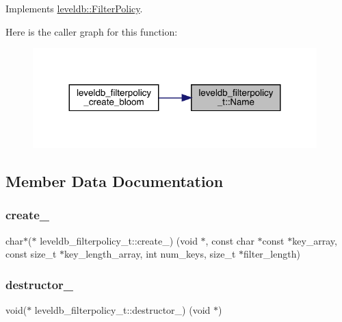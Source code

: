 Implements \mbox{\hyperlink{classleveldb_1_1_filter_policy_afd5e951892a2e740f186c0658913ea1b}{leveldb\+::\+Filter\+Policy}}.

Here is the caller graph for this function\+:
\nopagebreak
\begin{figure}[H]
\begin{center}
\leavevmode
\includegraphics[width=311pt]{structleveldb__filterpolicy__t_a94f31f3d4576ed53d9277e461717e9f3_icgraph}
\end{center}
\end{figure}


\subsection{Member Data Documentation}
\mbox{\label{structleveldb__filterpolicy__t_acf8194876ecb2c47ef33cb7a7dec3d8e}} 
\subsubsection{\texorpdfstring{create\_}{create\_}}
{\footnotesize\ttfamily char$\ast$($\ast$ leveldb\+\_\+filterpolicy\+\_\+t\+::create\+\_\+) (void $\ast$, const char $\ast$const  $\ast$key\+\_\+array, const size\+\_\+t $\ast$key\+\_\+length\+\_\+array, int num\+\_\+keys, size\+\_\+t $\ast$filter\+\_\+length)}

\mbox{\label{structleveldb__filterpolicy__t_ac743c53a14a4061cf30832a1861573ed}} 
\subsubsection{\texorpdfstring{destructor\_}{destructor\_}}
{\footnotesize\ttfamily void($\ast$ leveldb\+\_\+filterpolicy\+\_\+t\+::destructor\+\_\+) (void $\ast$)}

